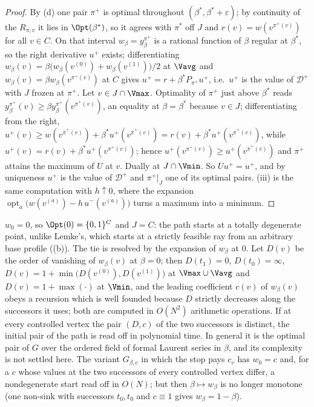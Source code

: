 \begin{proof}
By (d) one pair $\pi^{+}$ is optimal throughout
$(\beta^{\ast},\beta^{\ast}+\varepsilon)$; by continuity of the $R_{\pi,v}$ it
lies in $\Opt(\beta^{\ast})$, so it agrees with $\pi^{\ast}$ off $J$ and
$r(v)=w(v^{\pi^{+}(v)})$ for all $v\in C$. On that interval
$w_\beta=y^{\pi^{+}}_\beta$ is a rational function of $\beta$ regular at
$\beta^{\ast}$, so the right derivative $u^{+}$ exists; differentiating
$w_\beta(v)=\beta\bigl(w_\beta(v^{(0)})+w_\beta(v^{(1)})\bigr)/2$ at $\Vavg$ and
$w_\beta(v)=\beta w_\beta(v^{\pi^{+}(v)})$ at $C$ gives
$u^{+}=r+\beta^{\ast}P_{\pi^{+}}u^{+}$, i.e.\ $u^{+}$ is the value of
$\mathcal D^{+}$ with $J$ frozen at $\pi^{+}$. Let $v\in J\cap\Vmax$. Optimality
of $\pi^{+}$ just above $\beta^{\ast}$ reads
$y^{\pi^{+}}_\beta(v)\ge\beta y^{\pi^{+}}_\beta(v^{\bar\pi^{+}(v)})$, an equality
at $\beta=\beta^{\ast}$ because $v\in J$; differentiating from the right,
$u^{+}(v)\ge w(v^{\bar\pi^{+}(v)})+\beta^{\ast}u^{+}(v^{\bar\pi^{+}(v)})
=r(v)+\beta^{\ast}u^{+}(v^{\bar\pi^{+}(v)})$, while
$u^{+}(v)=r(v)+\beta^{\ast}u^{+}(v^{\pi^{+}(v)})$; hence
$u^{+}(v^{\pi^{+}(v)})\ge u^{+}(v^{\bar\pi^{+}(v)})$ and $\pi^{+}$ attains the
maximum of $U$ at $v$. Dually at $J\cap\Vmin$. So $Uu^{+}=u^{+}$, and by
uniqueness $u^{+}$ is the value of $\mathcal D^{+}$ and $\pi^{+}|_J$ one of its
optimal pairs. (iii) is the same computation with $h\uparrow0$, where the
expansion $\operatorname{opt}_a\bigl(w(v^{(a)})-h\,u^{-}(v^{(a)})\bigr)$ turns
a maximum into a minimum.
\end{proof}

\begin{proposition}\label{pp:start}
$w_0=0$, so $\Opt(0)=\{0,1\}^{C}$ and $J=C$: the path starts at a totally
degenerate point, unlike Lemke's, which starts at a strictly feasible ray from
an arbitrary base profile ((b)). The tie is resolved by
the expansion of $w_\beta$ at $0$. Let $D(v)$ be the order of vanishing of
$w_\beta(v)$ at $\beta=0$; then $D(t_1)=0$, $D(t_0)=\infty$,
$D(v)=1+\min\bigl(D(v^{(0)}),D(v^{(1)})\bigr)$ at $\Vmax\cup\Vavg$ and
$D(v)=1+\max(\cdot)$ at $\Vmin$, and the leading coefficient $c(v)$ of
$w_\beta(v)$ obeys a recursion which is well founded because $D$ strictly
decreases along the successors it uses; both are computed in $O(N^{2})$
arithmetic operations. If at every controlled vertex the pair $(D,c)$ of the two
successors is distinct, the initial pair of the path is read off in polynomial
time. In general it is the optimal pair of $G$ over the ordered field of formal
Laurent series in $\beta$, and its complexity is not settled here. The variant
$G_{\beta,c}$ in which the stop pays $c_v$ has $w_0=c$ and, for a $c$ whose
values at the two successors of every controlled vertex differ, a nondegenerate
start read off in $O(N)$; but then $\beta\mapsto w_\beta$ is no longer monotone
(one non-sink with successors $t_0,t_0$ and $c\equiv1$ gives $w_\beta=1-\beta$).
\end{proposition}

